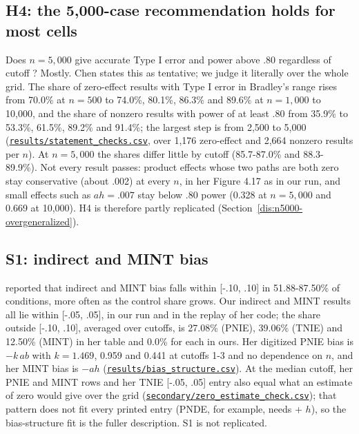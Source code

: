 \subsection{H4: the 5,000-case recommendation holds for most cells}\label{sec:h4}

Does $n = 5{,}000$ give accurate Type I error and power above .80 regardless of cutoff \citep[Chapter 5, printed p.~150]{chen2021}? Mostly. Chen states this as tentative; we judge it literally over the whole grid. The share of zero-effect results with Type I error in Bradley's range rises from 70.0\% at $n = 500$ to 74.0\%, 80.1\%, 86.3\% and 89.6\% at $n = 1{,}000$ to 10,000, and the share of nonzero results with power of at least .80 from 35.9\% to 53.3\%, 61.5\%, 89.2\% and 91.4\%; the largest step is from 2,500 to 5,000 (\href{https://github.com/alectionary/vibe-math/blob/master/formalization/chen-rdd-mediation/results/statement_checks.csv}{\nolinkurl{results/statement_checks.csv}}, over 1,176 zero-effect and 2,664 nonzero results per $n$). At $n = 5{,}000$ the shares differ little by cutoff (85.7-87.0\% and 88.3-89.9\%). Not every result passes: product effects whose two paths are both zero stay conservative (about .002) at every $n$, in her Figure 4.17 as in our run, and small effects such as $ah = .007$ stay below .80 power (0.328 at $n = 5{,}000$ and 0.669 at 10,000). H4 is therefore partly replicated (Section~\ref{dis:n5000-overgeneralized}).

\subsection{S1: indirect and MINT bias}\label{sec:s1}

\citet[Table 4.8]{chen2021} reported that indirect and MINT bias falls within [-.10, .10] in 51.88-87.50\% of conditions, more often as the control share grows. Our indirect and MINT results all lie within [-.05, .05], in our run and in the replay of her code; the share outside [-.10, .10], averaged over cutoffs, is 27.08\% (PNIE), 39.06\% (TNIE) and 12.50\% (MINT) in her table and 0.0\% for each in ours. Her digitized PNIE bias is $-k\,ab$ with $k = 1.469$, 0.959 and 0.441 at cutoffs 1-3 and no dependence on $n$, and her MINT bias is $-ah$ (\href{https://github.com/alectionary/vibe-math/blob/master/formalization/chen-rdd-mediation/results/bias_structure.csv}{\nolinkurl{results/bias_structure.csv}}). At the median cutoff, her PNIE and MINT rows and her TNIE [-.05, .05] entry also equal what an estimate of zero would give over the grid (\href{https://github.com/alectionary/vibe-math/blob/master/formalization/chen-rdd-mediation/secondary/zero_estimate_check.csv}{\nolinkurl{secondary/zero_estimate_check.csv}}); that pattern does not fit every printed entry (PNDE, for example, needs \cp{} + $h$), so the bias-structure fit is the fuller description. S1 is not replicated.

